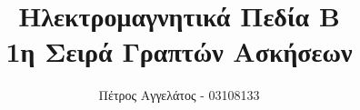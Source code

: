 \title{
  Ηλεκτρομαγνητικά Πεδία Β\\
  1η Σειρά Γραπτών Ασκήσεων
}
\ifanonymous{\iflncs
\author{}\institute{}
\fi}
\else
\author{Πέτρος Αγγελάτος - 03108133}
\iflncs
{}
\else
{}
\fi
\fi

